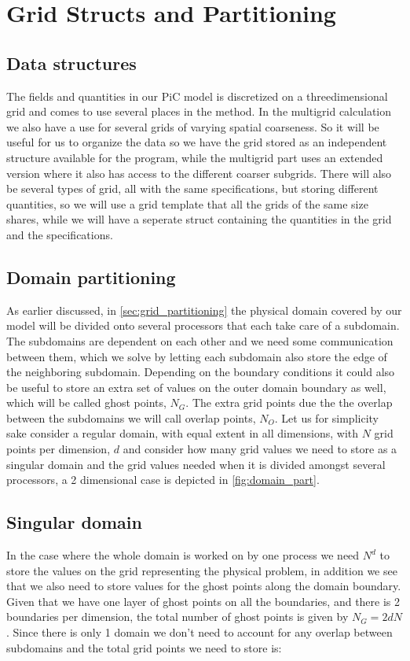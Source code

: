	\section{Grid Structs and Partitioning}

	\subsection{Data structures}
	The fields and quantities in our PiC model is discretized on a threedimensional
	grid and comes to use several places in the method. In the multigrid calculation
	we also have a use for several grids of varying spatial coarseness. So it will
	be useful for us to organize the data so we have the grid stored as an
	independent structure available for the program, while the multigrid part uses
	an extended version where it also has access to the different coarser subgrids.
	There will also be several types of grid, all with the same specifications,
	but storing different quantities, so we will use a grid template that all the
	grids of the same size shares, while we will have a seperate struct containing
	the quantities in the grid and the specifications.



	\subsection{Domain partitioning}
		As earlier discussed, in \ref{sec:grid_partitioning} the physical domain
		covered by our model will be divided onto several processors that each take
		care of a subdomain. The subdomains are dependent on each other and we need
		some communication between them, which we solve by letting each subdomain
		also store the edge of the neighboring subdomain. Depending on the boundary
		conditions it could also be useful to store an extra set of values on the
		outer domain boundary as well, which will be called ghost points, \(N_G\).
		The extra grid points due the the overlap between the subdomains we will call
		overlap points, \(N_O\). Let us for simplicity sake consider a regular domain,
		with equal extent in all dimensions, with \(N\) grid points per dimension,
		\(d\) and consider how many grid values we need to store as a singular domain
		and the grid values needed when it is divided amongst several processors, a
		2 dimensional case is depicted in \cref{fig:domain_part}.

		\subsection{Singular domain}
		In the case where the whole domain is worked on by one process we need \(N^d\)
		to store the values on the grid representing the physical problem, in addition
		we see that we also need to store values for the ghost points along the domain
		boundary. Given that we have one layer of ghost points on all the boundaries,
		and there is 2 boundaries per dimension, the total number of ghost points is
		given by \(N_G = 2dN\). Since there is only 1 domain we don't need to account
		for any overlap between subdomains and the total grid points we need to store is:

